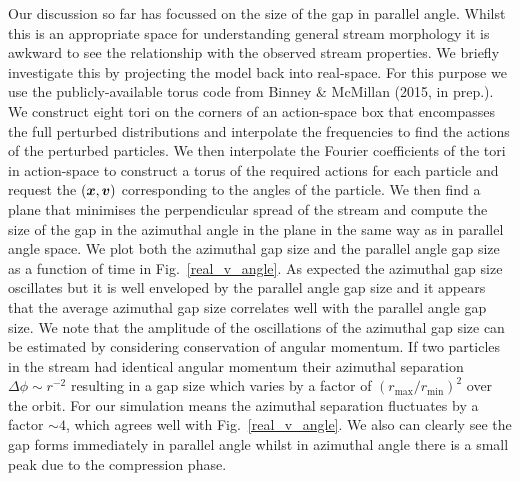 \documentclass[useAMS,usenatbib,fleqn,a4paper]{mn2e}
\newcommand{\bs}[1]{\bmath{#1}}
\begin{document}
Our discussion so far has focussed on the size of the gap in parallel angle. Whilst this is an appropriate space for understanding general stream morphology it is awkward to see the relationship with the observed stream properties. We briefly investigate this by projecting the model back into real-space. For this purpose we use the publicly-available torus code from Binney \& McMillan (2015, in prep.). We construct eight tori on the corners of an action-space box that encompasses the full perturbed distributions and interpolate the frequencies to find the actions of the perturbed particles. We then interpolate the Fourier coefficients of the tori in action-space to construct a torus of the required actions for each particle and request the $(\bs{x},\bs{v})$ corresponding to the angles of the particle. We then find a plane that minimises the perpendicular spread of the stream and compute the size of the gap in the azimuthal angle in the plane in the same way as in parallel angle space. We plot both the azimuthal gap size and the parallel angle gap size as a function of time in Fig.~\ref{real_v_angle}. As expected the azimuthal gap size oscillates but it is well enveloped by the parallel angle gap size and it appears that the average azimuthal gap size correlates well with the parallel angle gap size. We note that the amplitude of the oscillations of the azimuthal gap size can be estimated by considering conservation of angular momentum. If two particles in the stream had identical angular momentum their azimuthal separation $\Delta\phi\sim r^{-2}$ resulting in a gap size which varies by a factor of $(r_\mathrm{max}/r_\mathrm{min})^2$ over the orbit. For our simulation means the azimuthal separation fluctuates by a factor $\sim 4$, which agrees well with Fig.~\ref{real_v_angle}. We also can clearly see the gap forms immediately in parallel angle whilst in azimuthal angle there is a small peak due to the compression phase.
\end{document}
